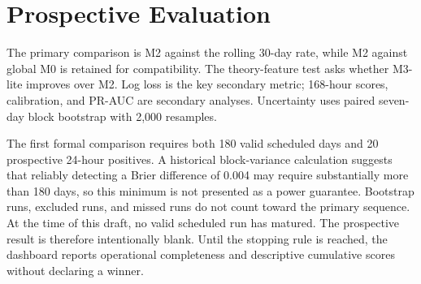 \section{Prospective Evaluation}

The primary comparison is M2 against the rolling 30-day rate, while M2 against global M0 is retained
for compatibility. The theory-feature test asks whether M3-lite improves over M2. Log loss is the key secondary metric; 168-hour scores, calibration,
and PR-AUC are secondary analyses. Uncertainty uses paired seven-day block bootstrap with 2,000
resamples.

The first formal comparison requires both 180 valid scheduled days and 20 prospective 24-hour
positives. A historical block-variance calculation suggests that reliably detecting a Brier
difference of 0.004 may require substantially more than 180 days, so this minimum is not presented
as a power guarantee. Bootstrap runs, excluded runs, and missed runs do
not count toward the primary sequence. At the time of this draft, no valid scheduled run has matured.
The prospective result is therefore intentionally blank. Until the stopping rule is reached, the
dashboard reports operational completeness and descriptive cumulative scores without declaring a
winner.
